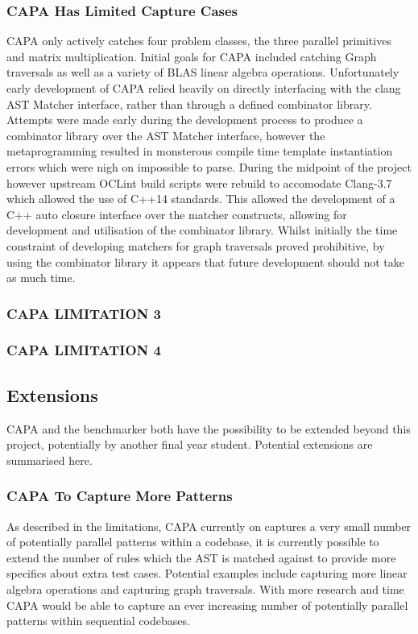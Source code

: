 \subsubsection{CAPA Has Limited Capture Cases}
CAPA only actively catches four problem classes, the three parallel primitives and matrix
multiplication. Initial goals for CAPA included catching Graph traversals as well as a variety of
BLAS linear algebra operations. Unfortunately early development of CAPA relied heavily on directly
interfacing with the clang AST Matcher interface, rather than through a defined combinator library.
Attempts were made early during the development process to produce a combinator library over the AST
Matcher interface, however the metaprogramming resulted in monsterous compile time template
instantiation errors which were nigh on impossible to parse. During the midpoint of the project
however upstream OCLint build scripts were rebuild to accomodate Clang-3.7 which allowed the use of
C++14 standards. This allowed the development of a C++ auto closure interface over the matcher
constructs, allowing for development and utilisation of the combinator library. Whilst initially
the time constraint of developing matchers for graph traversals proved prohibitive, by using the
combinator library it appears that future development should not take as much time.

\subsubsection{CAPA LIMITATION 3}

\subsubsection{CAPA LIMITATION 4}

\pagebreak

\subsection{Extensions}
CAPA and the benchmarker both have the possibility to be extended beyond this project, potentially
by another final year student. Potential extensions are summarised here.

\subsubsection{CAPA To Capture More Patterns}
As described in the limitations, CAPA currently on captures a very small number of potentially
parallel patterns within a codebase, it is currently possible to extend the number of rules which
the AST is matched against to provide more specifics about extra test cases. Potential examples
include capturing more linear algebra operations and capturing graph traversals. With more research
and time CAPA would be able to capture an ever increasing number of potentially parallel patterns
within sequential codebases.

